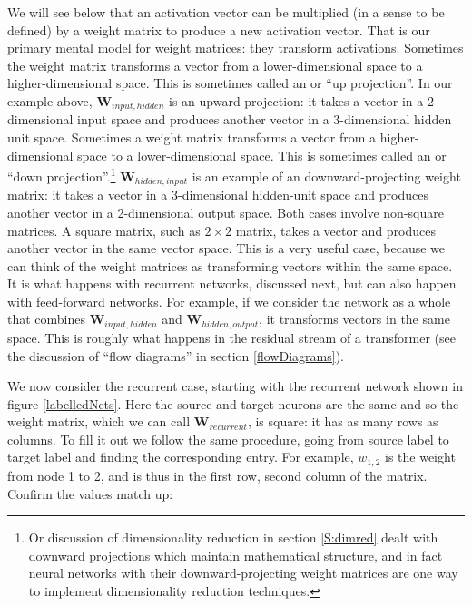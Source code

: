 We will see below that an activation vector can be multiplied (in a sense to be defined) by a weight matrix to produce a new activation vector. That is our primary mental model for weight matrices: they transform activations. Sometimes the weight matrix transforms a vector from a lower-dimensional space to a higher-dimensional space. This is sometimes called an  or ``up projection''. In our example above, $\textbf{W}_{input, hidden}$ is an upward projection: it takes a vector in a 2-dimensional input space and produces another vector in a 3-dimensional hidden unit space. Sometimes a weight matrix  transforms a vector from a higher-dimensional space to a lower-dimensional space. This is sometimes called an  or ``down projection''.\footnote{Or discussion of dimensionality reduction in section \ref{S:dimred} dealt with downward projections which maintain mathematical structure, and in fact neural networks with their downward-projecting weight matrices are one way to implement dimensionality reduction techniques.} $\textbf{W}_{hidden, input}$ is an example of an downward-projecting weight matrix: it takes a vector in a 3-dimensional hidden-unit space and produces another vector in a 2-dimensional output space. Both cases involve non-square matrices. A square matrix, such as $2 \times 2$ matrix, takes a vector and produces another vector in the same vector space. This is a very useful case, because we can think of the weight matrices as transforming vectors within the same space. It is what happens with recurrent networks, discussed next, but can also happen with feed-forward networks. For example, if we consider the network as a whole that combines  $\textbf{W}_{input, hidden}$ and  $\textbf{W}_{hidden, output}$, it transforms vectors in the same space. This is roughly what happens in the residual stream of a transformer (see the discussion of ``flow diagrams'' in section \ref{flowDiagrams}). 

We now consider the recurrent case, starting with the recurrent network shown in figure \ref{labelledNets}. Here the source and target neurons are the same and so the weight matrix, which we can call $\textbf{W}_{recurrent}$, is square: it has as many rows as columns. To fill it out we follow the same procedure, going from source label to target label and finding the corresponding entry. For example, $w_{1,2}$ is the weight from node 1 to 2, and is thus in the first row, second column of the matrix. Confirm the values match up:

